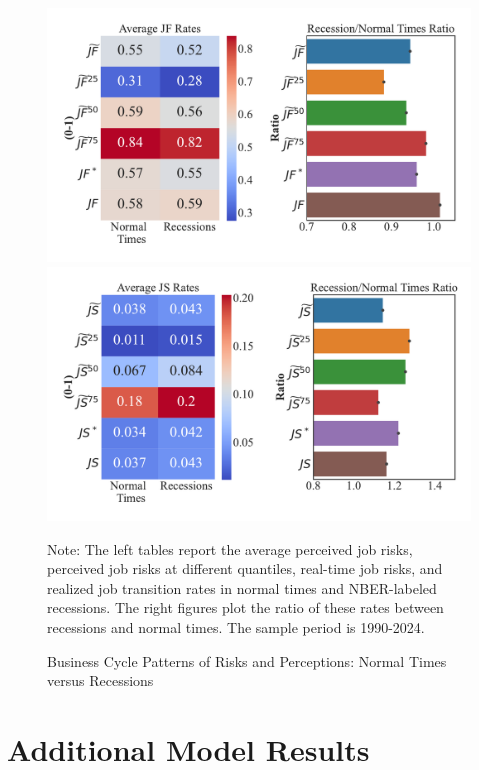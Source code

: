 \begin{figure}[pt] 
\centering 
	\caption{Business Cycle Patterns of Risks and Perceptions: Normal Times versus Recessions} 
	\label{fig:bus_cycle_stats_av}
\includegraphics[width=0.8\linewidth]{Figures/business_cycle_JF_stats.pdf} \\
\includegraphics[width=0.8\linewidth]{Figures/business_cycle_JS_stats.pdf} \\
    	\begin{flushleft}\footnotesize {Note: The left tables report the average perceived job risks, perceived job risks at different quantiles, real-time job risks, and realized job transition rates in normal times and NBER-labeled recessions. The right figures plot the ratio of these rates between recessions and normal times. The sample period is 1990-2024.} \end{flushleft}
\end{figure}



\section{Additional Model Results}
\label{appendix:model_results}





